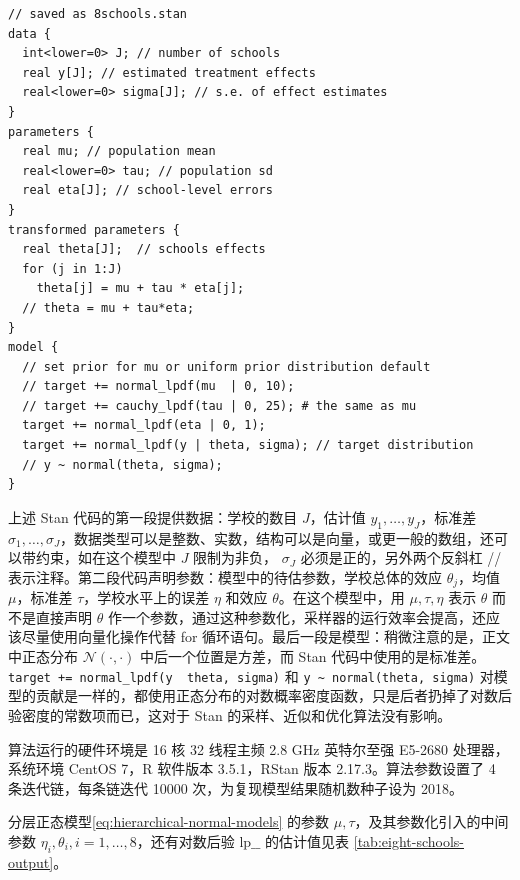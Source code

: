 \documentclass[12pt,a4paper,UTF8,twoside]{book}
\theoremstyle{definition}
\theoremstyle{definition}
\theoremstyle{definition}
\theoremstyle{remark}
\begin{document}
\begin{verbatim}
// saved as 8schools.stan
data {
  int<lower=0> J; // number of schools 
  real y[J]; // estimated treatment effects
  real<lower=0> sigma[J]; // s.e. of effect estimates 
}
parameters {
  real mu; // population mean
  real<lower=0> tau; // population sd
  real eta[J]; // school-level errors
}
transformed parameters {
  real theta[J];  // schools effects
  for (j in 1:J)
    theta[j] = mu + tau * eta[j];
  // theta = mu + tau*eta;
}
model {
  // set prior for mu or uniform prior distribution default
  // target += normal_lpdf(mu  | 0, 10); 
  // target += cauchy_lpdf(tau | 0, 25); # the same as mu
  target += normal_lpdf(eta | 0, 1);
  target += normal_lpdf(y | theta, sigma); // target distribution
  // y ~ normal(theta, sigma);
}
\end{verbatim}

上述 Stan 代码的第一段提供数据：学校的数目 \(J\)，估计值
\(y_1,\ldots,y_{J}\)，标准差
\(\sigma_1,\ldots,\sigma_{J}\)，数据类型可以是整数、实数，结构可以是向量，或更一般的数组，还可以带约束，如在这个模型中
\(J\) 限制为非负， \(\sigma_{J}\) 必须是正的，另外两个反斜杠 //
表示注释。第二段代码声明参数：模型中的待估参数，学校总体的效应
\(\theta_j\)，均值 \(\mu\)，标准差 \(\tau\)，学校水平上的误差 \(\eta\)
和效应 \(\theta\)。在这个模型中，用 \(\mu,\tau,\eta\) 表示 \(\theta\)
而不是直接声明 \(\theta\)
作一个参数，通过这种参数化，采样器的运行效率会提高，还应该尽量使用向量化操作代替
for 循环语句。最后一段是模型：稍微注意的是，正文中正态分布
\(\mathcal{N}(\cdot,\cdot)\) 中后一个位置是方差，而 Stan
代码中使用的是标准差。\texttt{target\ +=\ normal\_lpdf(y\ \textbar{}\ theta,\ sigma)}
和 \texttt{y\ \textasciitilde{}\ normal(theta,\ sigma)}
对模型的贡献是一样的，都使用正态分布的对数概率密度函数，只是后者扔掉了对数后验密度的常数项而已，这对于
Stan 的采样、近似和优化算法没有影响。

算法运行的硬件环境是 16 核 32 线程主频 2.8 GHz 英特尔至强 E5-2680
处理器，系统环境 CentOS 7，R 软件版本 3.5.1，RStan 版本
2.17.3。算法参数设置了 4 条迭代链，每条链迭代 10000
次，为复现模型结果随机数种子设为 2018。

分层正态模型\eqref{eq:hierarchical-normal-models} 的参数
\(\mu,\tau\)，及其参数化引入的中间参数
\(\eta_i,\theta_i,i=1,\ldots,8\)，还有对数后验 \(\mathrm{lp}\_\_\)
的估计值见表 \ref{tab:eight-schools-output}。
\end{document}
